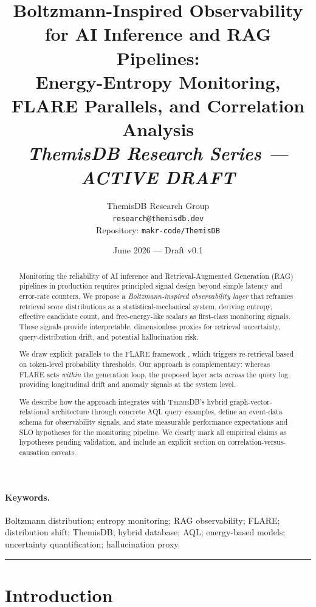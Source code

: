 \documentclass[11pt,a4paper]{article}
\title{%
  \textbf{Boltzmann-Inspired Observability for AI Inference and RAG Pipelines:}\\
  \textbf{Energy-Entropy Monitoring, FLARE Parallels, and Correlation Analysis}\\[0.5em]
  \large\textit{ThemisDB Research Series --- ACTIVE DRAFT}
}
\author{%
  ThemisDB Research Group\\
  \texttt{research@themisdb.dev}\\[0.3em]
  \small Repository: \texttt{makr-code/ThemisDB}
}
\date{June 2026 --- Draft v0.1}
\newcommand{\themisdb}{\textsc{ThemisDB}}
\theoremstyle{definition}
\begin{document}

\maketitle

\begin{abstract}
Monitoring the reliability of AI inference and Retrieval-Augmented Generation
(RAG) pipelines in production requires principled signal design beyond simple
latency and error-rate counters.
We propose a \emph{Boltzmann-inspired observability layer} that reframes
retrieval score distributions as a statistical-mechanical system, deriving
entropy, effective candidate count, and free-energy-like scalars as
first-class monitoring signals.
These signals provide interpretable, dimensionless proxies for retrieval
uncertainty, query-distribution drift, and potential hallucination risk.

We draw explicit parallels to the FLARE framework
\citep{jiang2023flare}, which triggers re-retrieval based on
token-level probability thresholds.
Our approach is complementary: whereas FLARE acts \emph{within} the
generation loop, the proposed layer acts \emph{across} the query log,
providing longitudinal drift and anomaly signals at the system level.

We describe how the approach integrates with \themisdb{}'s hybrid
graph-vector-relational architecture through concrete AQL query examples,
define an event-data schema for observability signals, and state
measurable performance expectations and SLO hypotheses for the monitoring
pipeline.
We clearly mark all empirical claims as hypotheses pending validation,
and include an explicit section on correlation-versus-causation caveats.
\end{abstract}

\paragraph{Keywords.}
Boltzmann distribution; entropy monitoring; RAG observability; FLARE;
distribution shift; ThemisDB; hybrid database; AQL; energy-based models;
uncertainty quantification; hallucination proxy.

\tableofcontents

\bigskip\hrule\bigskip

\section{Introduction}
\end{document}
